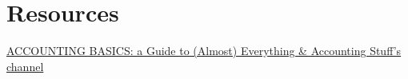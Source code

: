 \documentclass{article}
\begin{document}



\newpage
\tableofcontents
\newpage










\section{Resources}
\href{https://youtu.be/yYX4bvQSqbo?si=JNw8xPh7I50bIBxX}{ACCOUNTING BASICS: a Guide to (Almost) Everything \& Accounting Stuff's channel}
\end{document}

